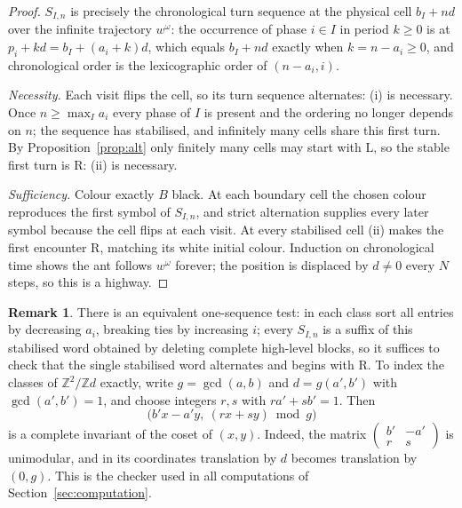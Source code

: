 \documentclass[11pt,reqno]{amsart}
\theoremstyle{plain}
\theoremstyle{definition}
\newtheorem{remark}[theorem]{Remark}
\newcommand{\Z}{\mathbb{Z}}
\newcommand{\drift}{d}
\newcommand{\turnR}{\mathrm{R}}
\newcommand{\turnL}{\mathrm{L}}
\begin{document}
\begin{proof}
$S_{I,n}$ is precisely the chronological turn sequence at the physical cell
$b_I+n\drift$ over the infinite trajectory $w^\omega$: the occurrence of phase
$i\in I$ in period $k\ge0$ is at $p_i+k\drift=b_I+(a_i+k)\drift$, which equals
$b_I+n\drift$ exactly when $k=n-a_i\ge0$, and chronological order is the
lexicographic order of $(n-a_i,i)$.

\emph{Necessity.} Each visit flips the cell, so its turn sequence alternates:
(i) is necessary. Once $n\ge\max_I a_i$ every phase of $I$ is present and the
ordering no longer depends on $n$; the sequence has stabilised, and infinitely
many cells share this first turn. By Proposition~\ref{prop:alt} only finitely
many cells may start with $\turnL$, so the stable first turn is $\turnR$: (ii) is
necessary.

\emph{Sufficiency.} Colour exactly $B$ black. At each boundary cell the chosen
colour reproduces the first symbol of $S_{I,n}$, and strict alternation supplies
every later symbol because the cell flips at each visit. At every stabilised cell
(ii) makes the first encounter $\turnR$, matching its white initial colour.
Induction on chronological time shows the ant follows $w^\omega$ forever; the
position is displaced by $\drift\neq0$ every $N$ steps, so this is a highway.
\end{proof}

\begin{remark}\label{rem:onesort}
There is an equivalent one-sequence test: in each class sort all entries by
decreasing $a_i$, breaking ties by increasing $i$; every $S_{I,n}$ is a suffix of
this stabilised word obtained by deleting complete high-level blocks, so it
suffices to check that the single stabilised word alternates and begins with
$\turnR$. To index the classes of $\Z^2/\Z\drift$ exactly, write
$g=\gcd(a,b)$ and $\drift=g(a',b')$ with $\gcd(a',b')=1$, and choose integers $r,s$
with $ra'+sb'=1$. Then
\[
\bigl(b'x-a'y,\ (rx+sy)\bmod g\bigr)
\]
is a complete invariant of the coset of $(x,y)$. Indeed, the matrix
$\left(\begin{smallmatrix}b'&-a'\\ r&s\end{smallmatrix}\right)$ is unimodular, and
in its coordinates translation by $\drift$ becomes translation by $(0,g)$. This is
the checker used in all computations of Section~\ref{sec:computation}.
\end{remark}

\end{document}
